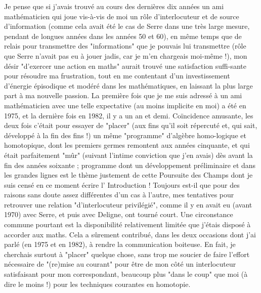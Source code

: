 Je pense que si j'avais trouvé au cours des dernières dix années un ami mathématicien qui joue vis-à-vis de moi un rôle d'interlocuteur et de source d'information (comme cela avait été le cas de Serre dans une très large mesure, pendant de longues années dans les années 50 et 60), en même temps que de relais pour transmettre des "informations" que je pouvais lui transmettre (rôle que Serre n'avait pas eu à jouer jadis, car je m'en chargeais moi-même !), mon désir "d'exercer une action en maths" aurait trouvé une satisfaction suffi-sante pour résoudre ma frustration, tout en me contentant d'un investissement d'énergie épisodique et modéré dans les mathématiques, en laissant la plus large part à ma nouvelle passion. La première fois que je me suis adressé à un ami mathématicien avec une telle expectative (au moins implicite en moi) a été en 1975, et la dernière fois en 1982, il y a un an et demi. Coïncidence amusante, les deux fois c'était pour essayer de "placer" (aux fins qu'il soit répercuté et, qui sait, développé à la fin des fins !) un même "programme" d'algèbre homo-logique et homotopique, dont les premiers germes remontent aux années cinquante, et qui était parfaitement "mûr" (suivant l'intime conviction que j'en avais) dès avant la fin des années soixante ; programme dont un développement préliminaire et dans les grandes lignes est le thème justement de cette Poursuite des Champs dont je suis censé en ce moment écrire l' Introduction ! Toujours est-il que pour des raisons sans doute assez différentes d'un cas à l'autre, mes tentatives pour retrouver une relation "d'interlocuteur privilégié", comme il y en avait eu (avant 1970) avec Serre, et puis avec Deligne, ont tourné court. Une circonstance commune pourtant est la disponibilité relativement limitée que j'étais disposé à accorder aux maths. Cela a sûrement contribué, dans les deux occasions dont j’ai parlé (en 1975 et en 1982), à rendre la communication boiteuse. En fait, je cherchais surtout à "placer" quelque chose, sans trop me soucier de faire l'effort nécessaire de "(re)mise au courant" pour être de mon côté un interlocuteur satisfaisant pour mon correspondant, beaucoup plus "dans le coup" que moi (à dire le moins !) pour les techniques courantes en homotopie.

